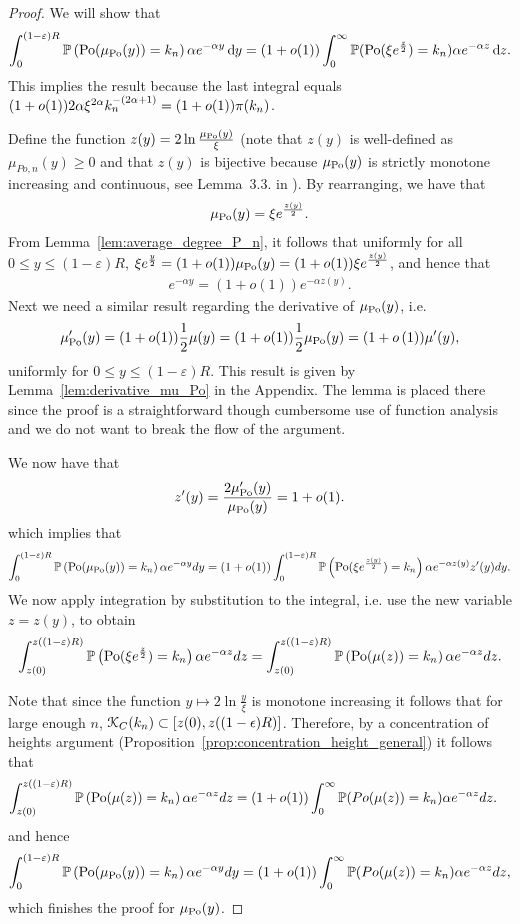 \begin{proof}
We will show that
\[
	\int_0^{(1-\varepsilon)R} \mathbb{P}\left({\mathrm{Po}}(\mu_{{\mathrm{Po}}}(y)) = k_n\right) \alpha e^{-\alpha y} \operatorname{\mathrm{d}\hspace{-2pt}} y
	= (1+o(1))\int_0^\infty \mathbb{P}({\mathrm{Po}}(\xi e^{\frac{z}{2}})=k_n) \alpha e^{-\alpha z} \operatorname{\mathrm{d}\hspace{-2pt}} z.
\]
This implies the result because the last integral equals $(1+o(1))2\alpha \xi^{2\alpha} k_n^{-(2\alpha+1)} = (1+o(1)){\pi}(k_n)$.

Define the function $z(y)=2\ln\frac{\mu_{{\mathrm{Po}}}(y)}{\xi}$ (note that $z(y)$ is well-defined as $\mu_{Po,n}(y)\geq 0$ and that $z(y)$ is bijective because $\mu_{{\mathrm{Po}}}(y)$ is strictly monotone increasing and continuous, see Lemma~3.3. in \cite{gugelmann2012random}). By rearranging, we have that
\begin{align*}
\mu_{{\mathrm{Po}}}(y) = \xi e^{\frac{z(y)}{2}}.
\end{align*}
From Lemma~\ref{lem:average_degree_P_n}, it follows that uniformly for all $0\leq y\leq (1-\varepsilon)R$, $\xi e^{\frac{y}{2}} = (1+o(1))\mu_{{\mathrm{Po}}}(y) = (1+o(1))\xi e^{\frac{z(y)}{2}}$, and hence that
\begin{align*}
e^{-\alpha y} = (1+o(1))e^{-\alpha z(y)}.
\end{align*}
Next we need a similar result regarding the derivative of $\mu_{{\mathrm{Po}}}(y)$, i.e.
\[
	\mu_{{\mathrm{Po}}}^\prime(y) = (1+o(1))\frac{1}{2}\mu(y) = (1+o(1))\frac{1}{2}\mu_{{\mathrm{Po}}}(y)
	= (1+o\left(1\right)) \mu^\prime(y),
\]
uniformly for $0 \leq  y \leq (1-\varepsilon)R$. This result is given by Lemma~\ref{lem:derivative_mu_Po} in the Appendix. The lemma is placed there since the proof is a straightforward though cumbersome use of function analysis and we do not want to break the flow of the argument.

We now have that
\[
	z^\prime(y) = \frac{2\mu_{{\mathrm{Po}}}^\prime(y)}{\mu_{{\mathrm{Po}}}(y)} = 1+o(1).
\]
which implies that
\begin{align*}
	\int_0^{(1-\varepsilon)R} \mathbb{P}\left({\mathrm{Po}}(\mu_{{\mathrm{Po}}}(y))=k_n\right) \alpha e^{-\alpha y}dy 
	= (1+o(1)) \int_0^{(1-\varepsilon)R} \mathbb{P}\left({\mathrm{Po}}(\xi e^{\frac{z(y)}{2}})=k_n\right)\alpha e^{-\alpha z(y)} z^\prime(y) dy.
\end{align*}
We now apply integration by substitution to the integral, i.e. use the new variable $z=z(y)$, to obtain 
\begin{align*}
	\int_{z(0)}^{z((1-\varepsilon)R)} \mathbb{P}\left({\mathrm{Po}}(\xi e^{\frac{z}{2}})=k_n\right)\alpha e^{-\alpha z} dz
	= \int_{z(0)}^{z((1-\varepsilon)R)} \mathbb{P}\left({\mathrm{Po}}(\mu(z))=k_n\right)\alpha e^{-\alpha z} dz.
\end{align*}


Note that since the function $y \mapsto 2\ln \frac{y}{\xi}$ is monotone increasing it follows that for large enough $n$, 
${\mathcal K}_C(k_n)\subset [z(0),z((1-\epsilon)R)]$. Therefore, by a concentration of heights argument (Proposition~\ref{prop:concentration_height_general}) it follows that
\begin{align*}
	\int_{z(0)}^{z((1-\varepsilon)R)} \mathbb{P}\left({\mathrm{Po}}(\mu(z))=k_n\right)\alpha e^{-\alpha z} dz 
	&= (1+o(1))\int_0^\infty \mathbb{P}(Po(\mu(z))=k_n)\alpha e^{-\alpha z}dz.
\end{align*}
and hence
\[
	\int_0^{(1-\varepsilon)R} \mathbb{P}\left({\mathrm{Po}}(\mu_{{\mathrm{Po}}}(y))=k_n\right) \alpha e^{-\alpha y}dy
	= (1+o(1))\int_0^\infty \mathbb{P}(Po(\mu(z))=k_n)\alpha e^{-\alpha z}dz,
\]
which finishes the proof for $\mu_{{\mathrm{Po}}}(y)$.


\end{proof}
